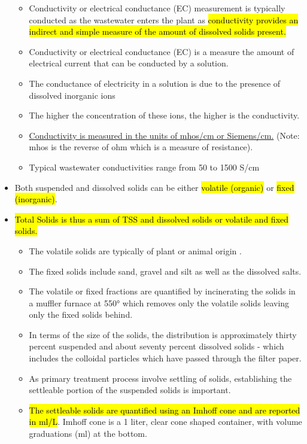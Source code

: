 \begin{itemize}
			      \begin{itemize}
			      	\item Conductivity or electrical conductance (EC) measurement is typically conducted as the wastewater enters the plant as \hl{conductivity provides an indirect and simple measure of the amount of dissolved solids present.}  
			      	\item Conductivity or electrical conductance (EC) is a measure the amount of electrical current that can be conducted by a solution.  
			      	\item The conductance of electricity in a solution is due to the presence of dissolved inorganic ions 
			      	\item The higher the concentration of these ions, the higher is the conductivity. 
			      	\item \underline{Conductivity is measured in the units of mhos/cm or Siemens/cm.}  (Note:  mhos is the reverse of ohm which is a measure of resistance).
			      	\item Typical wastewater conductivities range from 50 to 1500 S/cm
			      \end{itemize}
			\item Both suspended and dissolved solids can be either \hl{volatile (organic)} or \hl{fixed (inorganic)}.
			\item \hl{Total Solids is thus a sum of TSS and dissolved solids or volatile and fixed solids.}
			      \begin{itemize}
			      	\item The volatile solids are typically of plant or animal origin .
			      	\item The fixed solids include sand, gravel and silt as well as the dissolved salts.

			      	\item The volatile or fixed fractions are quantified by incinerating the solids in a muffler furnace at 550\si{\degree} which removes only the volatile solids leaving only the fixed solids behind.
			      	\item In terms of the size of the solids, the distribution is approximately thirty percent suspended and about seventy percent dissolved solids - which includes the colloidal particles which have passed through the filter paper.\\ 
			      	\item As primary treatment process involve settling of solids, establishing the settleable portion of the suspended solids is important.\\  
			      	\item \hl{The settleable solids are quantified using an Imhoff cone and are reported in ml/L}.  Imhoff cone is a 1 liter, clear cone shaped container, with volume graduations (ml) at the bottom.
			      						

\end{itemize}
\end{itemize}
